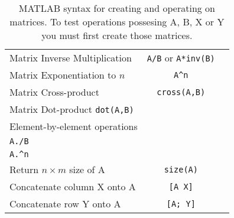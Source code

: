 \begin{table}[!b]
\begin{tabularx}{5.6in}{lcc}
		Matrix Inverse Multiplication & {\lstinline[style=Matlab-editor]!A/B!} or {\lstinline[style=Matlab-editor]!A*inv(B)!} & \\
		Matrix Exponentiation to $n$ & {\lstinline[style=Matlab-editor]!A^n!} &  \\
		Matrix Cross-product & {\lstinline[style=Matlab-editor]!cross(A,B)!}  & \\
		Matrix Dot-product {\lstinline[style=Matlab-editor]!dot(A,B)!}  & \\
		Element-by-element operations & 	\pbox{20em}{
		{\lstinline[style=Matlab-editor]!A.*B!}\\
		{\lstinline[style=Matlab-editor]!A./B!}\\
		{\lstinline[style=Matlab-editor]!A.^n!}} & \\
		Return $n \times m$ size of A & {\lstinline[style=Matlab-editor]!size(A)!} &  \\
 		Concatenate column X onto A & {\lstinline[style=Matlab-editor]![A X]!} &  \\
		Concatenate row Y onto A & {\lstinline[style=Matlab-editor]![A; Y]!} &  \\
	\bottomrule
	\end{tabularx}
	\caption{MATLAB syntax for creating and operating on matrices. To test operations possesing A, B, X or Y you must first create those matrices.}
	\label{tab:ArrayMATLABSyntax}
\end{table}